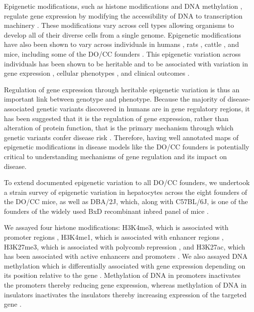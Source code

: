 \documentclass[
  11pt,
]{article}
\begin{document}
Epigenetic modifications, such as histone modifications
\citep{pmid32671792, pmid29625185} and DNA methylation
\citep{pmid21701563, pmid20720541}, regulate gene expression by
modifying the accessibility of DNA to transcription machinery
\citep{lawrence2016lateral, jones2012functions, moore2013dna}. These
modifications vary across cell types allowing organisms to develop all
of their diverse cells from a single genome. Epigenetic modifications
have also been shown to vary across individuals in humans
\citep{mcvicker2013identification, kang2021genetic}, rats
\citep{rintisch2014natural}, cattle \citep{prowse2022genetic}, and mice,
including some of the DO/CC founders
\citep{link2018analysis, schilling2009allele, zhou2022dna, grimm2019dna, xie2012base, gujar2018profiling}.
This epigenetic variation across individuals has been shown to be
heritable \citep{schilling2009allele, grimm2019dna} and to be associated
with variation in gene expression
\citep{kang2021genetic, rintisch2014natural, prowse2022genetic},
cellular phenotypes \citep{link2018analysis}, and clinical outcomes
\citep{kang2021genetic, hawe2022genetic}.

Regulation of gene expression through heritable epigenetic variation is
thus an important link between genotype and phenotype. Because the
majority of disease-associated genetic variants discovered in humans are
in gene regulatory regions, it has been suggested that it is the
regulation of gene expression, rather than alteration of protein
function, that is the primary mechanism through which genetic variants
confer disease risk
\citep{maurano2012systematic, farh2015genetic, pmid21617055, pmid19474294}.
Therefore, having well annotated maps of epigenetic modifications in
disease models like the DO/CC founders is potentially critical to
understanding mechanisms of gene regulation and its impact on disease.

To extend documented epigenetic variation to all DO/CC founders, we
undertook a strain survey of epigenetic variation in hepatocytes across
the eight founders of the DO/CC mice, as well as DBA/2J, which, along
with C57BL/6J, is one of the founders of the widely used BxD recombinant
inbred panel of mice \citep{Ashbrook:2019bd}.

We assayed four histone modifications: H3K4me3, which is associated with
promoter regions \citep{heintzman2007distinct, pmid15680324}, H3K4me1,
which is associated with enhancer regions \citep{heintzman2007distinct},
H3K27me3, which is associated with polycomb repression
\citep{bonasio2010molecular}, and H3K27ac, which has been associated
with active enhancers and promoters
\citep{creyghton2010histone, heintzman2009histone, rada2011unique}. We
also assayed DNA methylation which is differentially associated with
gene expression depending on its position relative to the gene
\citep{moore2013dna, jones2012functions}. Methylation of DNA in
promoters inactivates the promoters thereby reducing gene expression,
whereas methylation of DNA in insulators inactivates the insulators
thereby increasing expression of the targeted gene
\citep{jones2012functions}.
\end{document}
